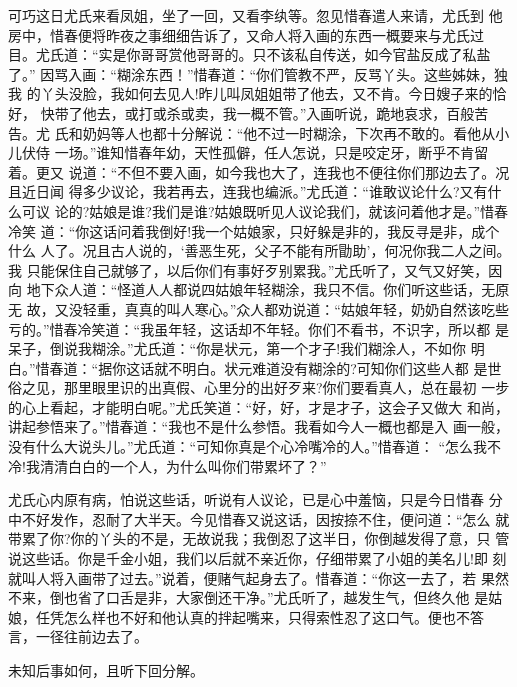 可巧这日尤氏来看凤姐，坐了一回，又看李纨等。忽见惜春遣人来请，尤氏到
他房中，惜春便将昨夜之事细细告诉了，又命人将入画的东西一概要来与尤氏过
目。尤氏道：“实是你哥哥赏他哥哥的。只不该私自传送，如今官盐反成了私盐了。”
因骂入画：“糊涂东西！”惜春道：“你们管教不严，反骂丫头。这些姊妹，独我
的丫头没脸，我如何去见人!昨儿叫凤姐姐带了他去，又不肯。今日嫂子来的恰好，
快带了他去，或打或杀或卖，我一概不管。”入画听说，跪地哀求，百般苦告。尤
氏和奶妈等人也都十分解说：“他不过一时糊涂，下次再不敢的。看他从小儿伏侍
一场。”谁知惜春年幼，天性孤僻，任人怎说，只是咬定牙，断乎不肯留着。更又
说道：“不但不要入画，如今我也大了，连我也不便往你们那边去了。况且近日闻
得多少议论，我若再去，连我也编派。”尤氏道：“谁敢议论什么?又有什么可议
论的?姑娘是谁?我们是谁?姑娘既听见人议论我们，就该问着他才是。”惜春冷笑
道：“你这话问着我倒好!我一个姑娘家，只好躲是非的，我反寻是非，成个什么
人了。况且古人说的，‘善恶生死，父子不能有所勖助’，何况你我二人之间。我
只能保住自己就够了，以后你们有事好歹别累我。”尤氏听了，又气又好笑，因向
地下众人道：“怪道人人都说四姑娘年轻糊涂，我只不信。你们听这些话，无原无
故，又没轻重，真真的叫人寒心。”众人都劝说道：“姑娘年轻，奶奶自然该吃些
亏的。”惜春冷笑道：“我虽年轻，这话却不年轻。你们不看书，不识字，所以都
是呆子，倒说我糊涂。”尤氏道：“你是状元，第一个才子!我们糊涂人，不如你
明白。”惜春道：“据你这话就不明白。状元难道没有糊涂的?可知你们这些人都
是世俗之见，那里眼里识的出真假、心里分的出好歹来?你们要看真人，总在最初
一步的心上看起，才能明白呢。”尤氏笑道：“好，好，才是才子，这会子又做大
和尚，讲起参悟来了。”惜春道：“我也不是什么参悟。我看如今人一概也都是入
画一般，没有什么大说头儿。”尤氏道：“可知你真是个心冷嘴冷的人。”惜春道：
“怎么我不冷!我清清白白的一个人，为什么叫你们带累坏了？”

尤氏心内原有病，怕说这些话，听说有人议论，已是心中羞恼，只是今日惜春
分中不好发作，忍耐了大半天。今见惜春又说这话，因按捺不住，便问道：“怎么
就带累了你?你的丫头的不是，无故说我；我倒忍了这半日，你倒越发得了意，只
管说这些话。你是千金小姐，我们以后就不亲近你，仔细带累了小姐的美名儿!即
刻就叫人将入画带了过去。”说着，便赌气起身去了。惜春道：“你这一去了，若
果然不来，倒也省了口舌是非，大家倒还干净。”尤氏听了，越发生气，但终久他
是姑娘，任凭怎么样也不好和他认真的拌起嘴来，只得索性忍了这口气。便也不答
言，一径往前边去了。

未知后事如何，且听下回分解。
